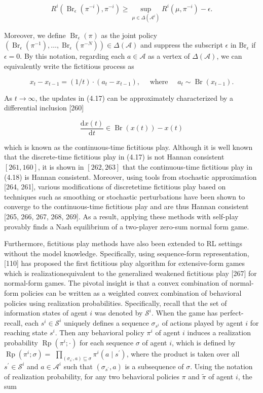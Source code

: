 \documentclass[10pt]{article}
\begin{document}
\[
R^{i}\left(\operatorname{Br}_{\epsilon}\left(\pi^{-i}\right), \pi^{-i}\right) \geq \sup _{\mu \in \Delta\left(\mathcal{A}^{i}\right)} R^{i}\left(\mu, \pi^{-i}\right)-\epsilon .
\]

Moreover, we define $\operatorname{Br}_{\epsilon}(\pi)$ as the joint policy $\left(\operatorname{Br}_{\epsilon}\left(\pi^{-1}\right), \ldots, \operatorname{Br}_{\epsilon}\left(\pi^{-N}\right)\right) \in \Delta(\mathcal{A})$ and suppress the subscript $\epsilon$ in $\mathrm{Br}_{\epsilon}$ if $\epsilon=0$. By this notation, regarding each $a \in \mathcal{A}$ as a vertex of $\Delta(\mathcal{A})$, we can equivalently write the fictitious process as

\[
x_{t}-x_{t-1}=(1 / t) \cdot\left(a_{t}-x_{t-1}\right), \quad \text { where } \quad a_{t} \sim \operatorname{Br}\left(x_{t-1}\right) .
\]

As $t \rightarrow \infty$, the updates in (4.17) can be approximately characterized by a differential inclusion [260]

\[
\frac{\mathrm{d} x(t)}{\mathrm{d} t} \in \operatorname{Br}(x(t))-x(t)
\]

which is known as the continuous-time fictitious play. Although it is well known that the discrete-time fictitious play in (4.17) is not Hannan consistent $[261,160]$, it is shown in $[262,263]$ that the continuous-time fictitious play in (4.18) is Hannan consistent. Moreover, using tools from stochastic approximation [264, 261], various modifications of discretetime fictitious play based on techniques such as smoothing or stochastic perturbations have been shown to converge to the continuous-time fictitious play and are thus Hannan consistent [265, 266, 267, 268, 269]. As a result, applying these methods with self-play provably finds a Nash equilibrium of a two-player zero-sum normal form game.

Furthermore, fictitious play methods have also been extended to RL settings without the model knowledge. Specifically, using sequence-form representation, [110] has proposed the first fictitious play algorithm for extensive-form games which is realizationequivalent to the generalized weakened fictitious play [267] for normal-form games. The pivotal insight is that a convex combination of normal-form policies can be written as a weighted convex combination of behavioral policies using realization probabilities. Specifically, recall that the set of information states of agent $i$ was denoted by $\mathcal{S}^{i}$. When the game has perfect-recall, each $s^{i} \in \mathcal{S}^{i}$ uniquely defines a sequence $\sigma_{s^{i}}$ of actions played by agent $i$ for reaching state $s^{i}$. Then any behavioral policy $\pi^{i}$ of agent $i$ induces a realization probability $\operatorname{Rp}\left(\pi^{i} ; \cdot\right)$ for each sequence $\sigma$ of agent $i$, which is defined by $\operatorname{Rp}\left(\pi^{i} ; \sigma\right)=$ $\prod_{\left(\sigma_{s^{\prime}}, a\right) \sqsubseteq \sigma} \pi^{i}\left(a \mid s^{\prime}\right)$, where the product is taken over all $s^{\prime} \in \mathcal{S}^{i}$ and $a \in \mathcal{A}^{i}$ such that $\left(\sigma_{s^{\prime}}, a\right)$ is a subsequence of $\sigma$. Using the notation of realization probability, for any two behavioral policies $\pi$ and $\widetilde{\pi}$ of agent $i$, the sum
\end{document}

